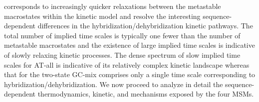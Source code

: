 \documentclass[journal=jpcbfk,manuscript=article]{achemso}
\begin{document}
corresponds to increasingly quicker relaxations between the metastable macrostates within the kinetic model and resolve the interesting sequence-dependent differences in the hybridization/dehybridization kinetic pathways. The total number of implied time scales is typically one fewer than the number of metastable macrostates and the existence of large implied time scales is indicative of slowly relaxing kinetic processes. The dense spectrum of slow implied time scales for AT-all is indicative of its relatively complex kinetic landscape whereas that for the two-state GC-mix comprises only a single time scale corresponding to hybridization/dehybridization. We now proceed to analyze in detail the sequence-dependent thermodynamics, kinetic, and mechanisms exposed by the four MSMs.




\end{document}
